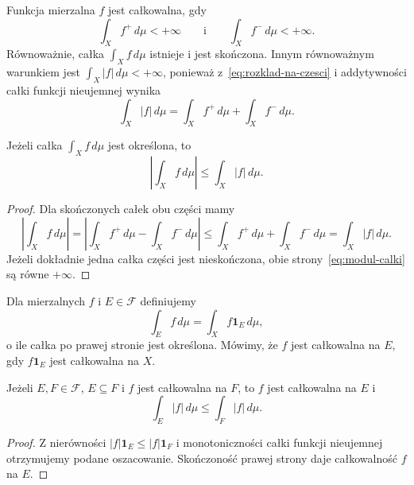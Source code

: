 \begin{definicja}[Całkowalność]
\label{def:calkowalnosc}
Funkcja mierzalna $f$ jest całkowalna, gdy
\[
  \int_X f^+\,d\mu<+\infty\qquad\text{i}\qquad
  \int_X f^-\,d\mu<+\infty.
\]
Równoważnie, całka $\int_X f\,d\mu$ istnieje i jest skończona.
Innym równoważnym warunkiem jest $\int_X |f|\,d\mu<+\infty$,
ponieważ z~\eqref{eq:rozklad-na-czesci} i addytywności całki funkcji
nieujemnej wynika
\[
  \int_X |f|\,d\mu=\int_X f^+\,d\mu+\int_X f^-\,d\mu.
\]
\end{definicja}

\begin{fakt}
\label{fakt:modul-calki}
Jeżeli całka $\int_X f\,d\mu$ jest określona, to
\begin{equation}
  \left|\int_X f\,d\mu\right|\leq \int_X|f|\,d\mu.
  \label{eq:modul-calki}
\end{equation}
\end{fakt}

\begin{proof}
Dla skończonych całek obu części mamy
\[
  \left|\int_X f\,d\mu\right|
  =\left|\int_X f^+\,d\mu-\int_X f^-\,d\mu\right|
  \leq\int_X f^+\,d\mu+\int_X f^-\,d\mu
  =\int_X|f|\,d\mu.
\]
Jeżeli dokładnie jedna całka części jest nieskończona,
obie strony~\eqref{eq:modul-calki} są równe $+\infty$.
\end{proof}

\begin{definicja}
\label{def:calkowalnosc-na-zbiorze}
Dla mierzalnych $f$ i $E\in\mathcal F$ definiujemy
\[
  \int_E f\,d\mu=\int_X f\mathbf{1}_E\,d\mu,
\]
o ile całka po prawej stronie jest określona. Mówimy, że $f$ jest
całkowalna na $E$, gdy $f\mathbf{1}_E$ jest całkowalna na $X$.
\end{definicja}

\begin{fakt}
\label{fakt:calkowalnosc-na-podzbiorze}
Jeżeli $E,F\in\mathcal F$, $E\subseteq F$ i $f$ jest całkowalna na $F$,
to $f$ jest całkowalna na $E$ i
\[
  \int_E |f|\,d\mu\leq\int_F |f|\,d\mu.
\]
\end{fakt}

\begin{proof}
Z nierówności $|f|\mathbf{1}_E\leq |f|\mathbf{1}_F$ i monotoniczności
całki funkcji nieujemnej otrzymujemy podane oszacowanie. Skończoność
prawej strony daje całkowalność $f$ na $E$.
\end{proof}
